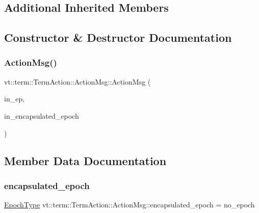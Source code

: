 \subsection*{Additional Inherited Members}


\subsection{Constructor \& Destructor Documentation}
\mbox{\label{structvt_1_1term_1_1_term_action_1_1_action_msg_af6b21910f9a4376c20b5e475deecc2cd}} 
\subsubsection{\texorpdfstring{Action\+Msg()}{ActionMsg()}}
{\footnotesize\ttfamily vt\+::term\+::\+Term\+Action\+::\+Action\+Msg\+::\+Action\+Msg (\begin{DoxyParamCaption}\item[{\hyperlink{namespacevt_a81d11b28122d43bf9834577e4a06440f}{Epoch\+Type}}]{in\+\_\+ep,  }\item[{\hyperlink{namespacevt_a81d11b28122d43bf9834577e4a06440f}{Epoch\+Type}}]{in\+\_\+encapsulated\+\_\+epoch }\end{DoxyParamCaption})\hspace{0.3cm}{\ttfamily [inline]}}



\subsection{Member Data Documentation}
\mbox{\label{structvt_1_1term_1_1_term_action_1_1_action_msg_a38713a73a2872552ac0f129bc575c963}} 
\subsubsection{\texorpdfstring{encapsulated\+\_\+epoch}{encapsulated\_epoch}}
{\footnotesize\ttfamily \hyperlink{namespacevt_a81d11b28122d43bf9834577e4a06440f}{Epoch\+Type} vt\+::term\+::\+Term\+Action\+::\+Action\+Msg\+::encapsulated\+\_\+epoch = no\+\_\+epoch}

